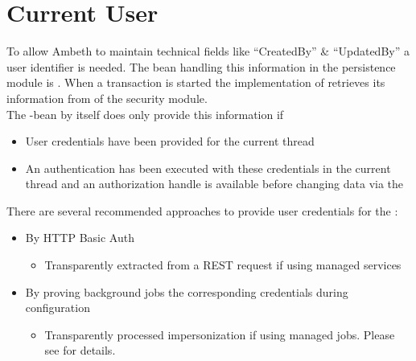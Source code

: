 \goodbreak
\section{Current User}
\label{feature:CurrentUser}
To allow Ambeth to maintain technical fields like ``CreatedBy'' \& ``UpdatedBy'' a user identifier is needed. The bean handling this information in the persistence module is . When a transaction is started the implementation of  retrieves its information from  of the security module.\\

The \type{ISecurityContextHolder]}-bean by itself does only provide this information if
\begin{itemize}
	\item User credentials have been provided for the current thread
	\item An authentication has been executed with these credentials in the current thread and an authorization handle is available before changing data via the 
\end{itemize}

There are several recommended approaches to provide user credentials for the :
\begin{itemize}
	\item By HTTP Basic Auth
		\begin{itemize}
			\item Transparently extracted from a REST request if using \AMBETH{} managed services
		\end{itemize}
	\item By proving background jobs the corresponding credentials during configuration
		\begin{itemize}
			\item Transparently processed impersonization if using \AMBETH{} managed jobs. Please see  for details.
		\end{itemize}
\end{itemize}

